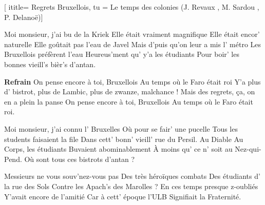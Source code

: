  [
ititle= {Regrets Bruxellois},
tu = {Le temps des colonies (J. Revaux , M. Sardou , P. Delanoë)}]

\beginverse
Moi monsieur, j'ai bu de la Kriek
Elle était vraiment magnifique
Elle était encor' naturelle
Elle goûtait pas l'eau de Javel
Mais d'puis qu'on leur a mis l' métro
Les Bruxellois préfèrent l'eau
Heureus'ment qu' y'a les étudiants
Pour boir' les bonnes vieill's bièr's d'antan.
\endverse

\beginchorus
\textbf {Refrain}
On pense encore à toi, Bruxellois
Au temps où le Faro était roi
Y'a plus d' bistrot, plus de Lambic, plus de zwanze, malchance !
Mais des regrets, ça, on en a plein la panse
On pense encore à toi, Bruxellois
Au temps où le Faro était roi.
\endchorus

\beginverse
Moi monsieur, j'ai connu l' Bruxelles
Où pour se fair' une pucelle
Tous les students faisaient la file
Dans cett' bonn' vieill' rue du Persil.
Au Diable Au Corps, les étudiants
Buvaient abominablement
À moins qu' ce n' soit au Nez-qui-Pend.
Où sont tous ces bistrots d'antan ?
\endverse

\beginverse
Messieurs ne vous souv'nez-vous pas
Des très héroïques combats
Des étudiants d' la rue des Sols
Contre les Apach's des Marolles ?
En ces temps presque z-oubliés
Y'avait encore de l'amitié
Car à cett' époque l'ULB
Signifiait la Fraternité.
\endverse

\endsong